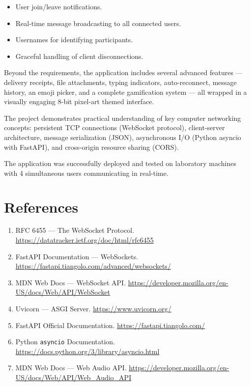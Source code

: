 \documentclass[12pt, a4paper]{article}
\begin{document}
\begin{itemize}[leftmargin=*]
    \item[\checkmark] User join/leave notifications.
    \item[\checkmark] Real-time message broadcasting to all connected users.
    \item[\checkmark] Usernames for identifying participants.
    \item[\checkmark] Graceful handling of client disconnections.
\end{itemize}

Beyond the requirements, the application includes several advanced features — delivery receipts, file attachments, typing indicators, auto-reconnect, message history, an emoji picker, and a complete gamification system — all wrapped in a visually engaging 8-bit pixel-art themed interface.

The project demonstrates practical understanding of key computer networking concepts: persistent TCP connections (WebSocket protocol), client-server architecture, message serialization (JSON), asynchronous I/O (Python asyncio with FastAPI), and cross-origin resource sharing (CORS).

The application was successfully deployed and tested on laboratory machines with 4 simultaneous users communicating in real-time.


\section{References}

\begin{enumerate}[leftmargin=*]
    \item RFC 6455 — The WebSocket Protocol. \url{https://datatracker.ietf.org/doc/html/rfc6455}
    \item FastAPI Documentation — WebSockets. \url{https://fastapi.tiangolo.com/advanced/websockets/}
    \item MDN Web Docs — WebSocket API. \url{https://developer.mozilla.org/en-US/docs/Web/API/WebSocket}
    \item Uvicorn — ASGI Server. \url{https://www.uvicorn.org/}
    \item FastAPI Official Documentation. \url{https://fastapi.tiangolo.com/}
    \item Python \texttt{asyncio} Documentation. \url{https://docs.python.org/3/library/asyncio.html}
    \item MDN Web Docs — Web Audio API. \url{https://developer.mozilla.org/en-US/docs/Web/API/Web_Audio_API}
\end{enumerate}
\end{document}
